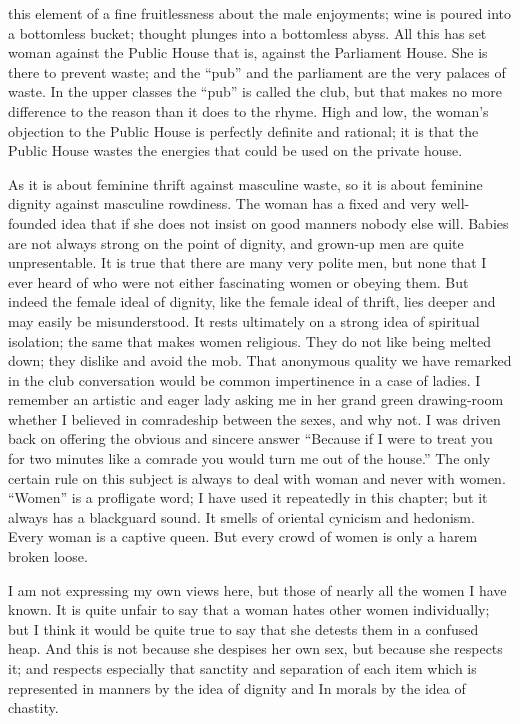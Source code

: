 \documentclass{book}
\begin{document}
this element of a fine fruitlessness about the male enjoyments; wine is poured into a bottomless bucket; thought plunges into a bottomless abyss. All this has set woman against the Public House that is, against the Parliament House. She is there to prevent waste; and the “pub” and the parliament are the very palaces of waste. In the upper classes the “pub” is called the club, but that makes no more difference to the reason than it does to the rhyme. High and low, the woman’s objection to the Public House is perfectly definite and rational; it is that the Public House wastes the energies that could be used on the private house.

As it is about feminine thrift against masculine waste, so it is about feminine dignity against masculine rowdiness. The woman has a fixed and very well-founded idea that if she does not insist on good manners nobody else will. Babies are not always strong on the point of dignity, and grown-up men are quite unpresentable. It is true that there are many very polite men, but none that I ever heard of who were not either fascinating women or obeying them. But indeed the female ideal of dignity, like the female ideal of thrift, lies deeper and may easily be misunderstood. It rests ultimately on a strong idea of spiritual isolation; the same that makes women religious. They do not like being melted down; they dislike and avoid the mob. That anonymous quality we have remarked in the club conversation would be common impertinence in a case of ladies. I remember an artistic and eager lady asking me in her grand green drawing-room whether I believed in comradeship between the sexes, and why not. I was driven back on offering the obvious and sincere answer “Because if I were to treat you for two minutes like a comrade you would turn me out of the house.” The only certain rule on this subject is always to deal with woman and never with women. “Women” is a profligate word; I have used it repeatedly in this chapter; but it always has a blackguard sound. It smells of oriental cynicism and hedonism. Every woman is a captive queen. But every crowd of women is only a harem broken loose.

I am not expressing my own views here, but those of nearly all the women I have known. It is quite unfair to say that a woman hates other women individually; but I think it would be quite true to say that she detests them in a confused heap. And this is not because she despises her own sex, but because she respects it; and respects especially that sanctity and separation of each item which is represented in manners by the idea of dignity and In morals by the idea of chastity.
\end{document}
